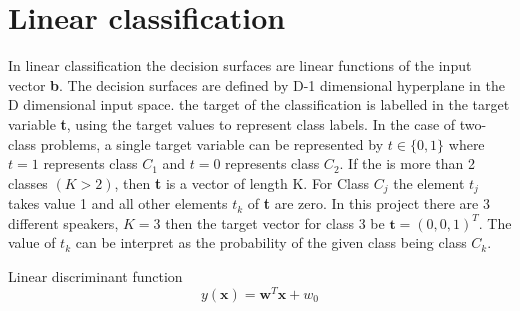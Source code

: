 \chapter{Linear classification}
In linear classification the decision surfaces are linear functions of the input vector \textbf{b}. 
The decision surfaces are defined by D-1 dimensional hyperplane in the D dimensional input space.
the target of the classification is labelled in the target variable \textbf{t}, using the target values to represent class labels. 
In the case of two-class problems, a single target variable can be represented by $t\in \lbrace 0,1\rbrace$ where $t = 1$ represents class $C_1$ and $t = 0$ represents class $C_2$.
If the is more than 2 classes $(K>2)$, then \textbf{t} is a vector of length K.
For Class $C_j$ the element $t_j$ takes value 1 and all other elements $t_k$ of \textbf{t} are zero.
In this project there are 3 different speakers, $K = 3$ then the target vector for class 3 be $\textbf{t} = (0, 0, 1)^T$.
The value of $t_k$ can be interpret as the probability of the given class being class $C_k$.



Linear discriminant function
\begin{equation}
y(\textbf{x}) = \textbf{w}^T \textbf{x}+w_0
\label{eq:lineDis}
\end{equation}
